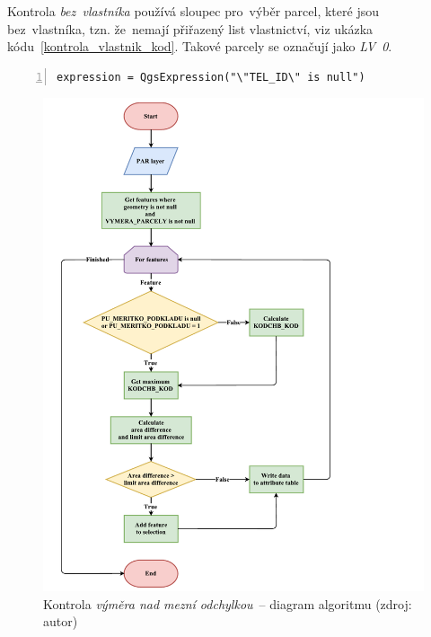 Kontrola \textit{bez~vlastníka} používá sloupec
\texttt{} pro~výběr parcel, které jsou
bez~vlastníka, tzn. že~nemají přiřazený list vlastnictví, viz ukázka
kódu~\ref{kontrola_vlastnik_kod}. Takové parcely se označují jako
\textit{LV~0}.

{\scriptsize
\begin{lstlisting}[style=python, caption={Kontrola
\textit{bez~vlastníka}~– vzorec pro~výběr prvků}, captionpos=b,
label=kontrola_vlastnik_kod, backgroundcolor = \color{light-gray},
numbers=left]
expression = QgsExpression("\"TEL_ID\" is null")
\end{lstlisting}}

	\begin{figure}[H] \centering
		\includegraphics[width=1.2\textwidth]{./pictures/vymera.pdf}
		\caption[Kontrola \textit{výměra nad mezní
odchylkou}~– diagram algoritmu]{Kontrola \textit{výměra nad mezní
odchylkou}~– diagram algoritmu (zdroj: autor)}
		\label{fig:diagram_vymera}
 	\end{figure}

